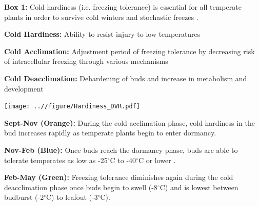 \documentclass{article}\usepackage[]{graphicx}\usepackage[]{color}
\begin{document}
\begin{table}
\begin{siderules}
{\large{\textbf {Box 1: } }}
\newline
Cold hardiness (i.e. freezing tolerance) is essential for all temperate plants in order to survive cold winters and stochastic freezes \citep{Vitasse2014}.
\begin{description}
\item \textbf{Cold Hardiness:} Ability to resist injury to low temperatures
\item \textbf{Cold Acclimation: } Adjustment period of freezing tolerance by decreasing risk of intracellular freezing through various mechanisms \citep{Charrier2011}
\item \textbf{Cold Deacclimation: } Dehardening of buds and increase in metabolism and development \citep{Vitasse2014}
\end{description}

 \begin{flushright}
 \texttt{[image: ..//figure/Hardiness\_DVR.pdf]}
 \end{flushright}
\begin{description} 
\item \textbf{Sept-Nov (Orange): } During the cold acclimation phase, cold hardiness in the bud increases rapidly as temperate plants begin to enter dormancy.
\item \textbf{Nov-Feb (Blue): } Once buds reach the dormancy phase, buds are able to tolerate temperates as low as -25$^{\circ}$C to -40$^{\circ}$C or lower \citep{Charrier2011,Vitasse2014}.
\item \textbf{Feb-May (Green): } Freezing tolerance diminishes again during the cold deacclimation phase once buds begin to swell (-8$^{\circ}$C) and is lowest between budburst (-2$^{\circ}$C) to leafout (-3$^{\circ}$C).
\end{description}
\end{siderules}
\end{table}
\end{document}
